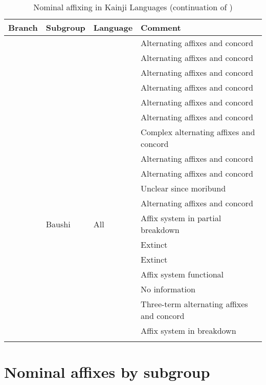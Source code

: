 \documentclass[output=paper]{langsci/langscibook}
\begin{document}
\begin{table}
\caption{\label{tab:kainji:1b} Nominal affixing in Kainji Languages  (continuation of )}
\begin{tabularx}{\textwidth}{lllQ}
\lsptoprule
{Branch}	& {Subgroup}	&   {Language}	&   {Comment}\\
\midrule
{} 	& 	& 	& Alternating affixes and concord\\
\tablevspace
	& 	& 	& Alternating affixes and concord\\
\tablevspace
	& 	& 	& Alternating affixes and concord\\
\tablevspace
	& 	& 	& Alternating affixes and concord\\
\tablevspace
	& 	& 	& Alternating affixes and concord\\
\tablevspace
	& 	& 	& Alternating affixes and concord\\
\tablevspace
	& 	& 	& Complex alternating affixes and concord\\ 
\tablevspace
{} 	& 	& 	& Alternating affixes and concord\\
\tablevspace
	& 	& 	& Alternating affixes and concord\\
\tablevspace
	& 	& 	& Unclear since moribund\\
\tablevspace
	& 	& 	& Alternating affixes and concord\\
\tablevspace
	& Baushi	& All	& Affix system in partial breakdown\\
\tablevspace  
{} 	& 	& 	& Extinct\\
\tablevspace
	& 	& 	& Extinct\\
\tablevspace
	& 	& 	& Affix system functional\\
\tablevspace
	& 	& 	& No information\\
\tablevspace
	& 	& 	& Three-term alternating affixes and concord\\
\tablevspace
	& 	& 	& Affix system in breakdown\\
\lspbottomrule
\end{tabularx}
\end{table}


\section{Nominal affixes by subgroup}\label{sec:kainji:3}
\end{document}

